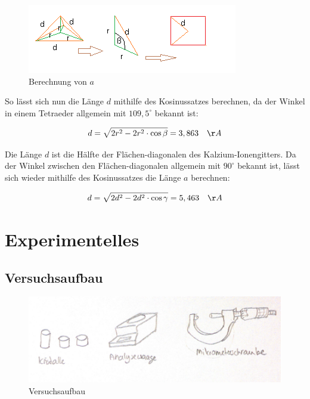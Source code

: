 \documentclass[12pt,a4paper,titlepage,headinclude,bibtotoc]{scrartcl}
\begin{document}
\begin{figure} [h]
\begin{center}
\includegraphics[scale=1]{a.png} \end{center}
\caption{Berechnung von $a$}
\end{figure} 

So lässt sich nun die Länge $d$ mithilfe des Kosinussatzes berechnen, da der Winkel in einem Tetraeder allgemein mit $109,5^\circ$ bekannt ist:

\begin{equation}
 d = \sqrt{2r^2-2r^2 \cdot \cos \beta } = 3, 863 \quad \AA
\end{equation}     

Die Länge $d$ ist die Hälfte der Flächen-diagonalen des Kalzium-Ionengitters. Da der Winkel zwischen den Flächen-diagonalen allgemein mit $ 90^\circ $ bekannt ist, lässt sich wieder mithilfe des Kosinussatzes die Länge $a$ berechnen:

\begin{equation}
 d = \sqrt{2d^2-2d^2 \cdot \cos \gamma } = 5,463 \quad \AA
\end{equation}   

\section{Experimentelles}


\subsection{Versuchsaufbau}
\begin{figure} [h]
\begin{center}
\includegraphics[scale=1]{Versuchsaufbau2.png} \end{center}
\caption{Versuchsaufbau}
\end{figure} 
\end{document}

